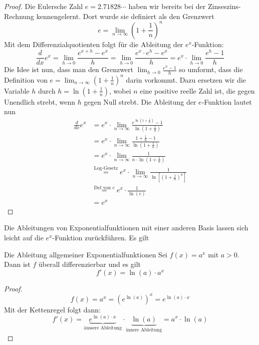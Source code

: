 \begin{proof}
    Die Eulersche Zahl $e=2.71828\cdots$ haben wir bereits bei der Zinseszins-Rechnung kennengelernt. Dort wurde sie definiert als den Grenzwert
    $$
        e= \lim_{n\rightarrow\infty} \left(1+\frac{1}{n}\right)^n
    $$
    Mit dem Differenzialquotienten folgt für die Ableitung der $e^x$-Funktion:
    $$
        \frac{d}{dx} e^x = \lim_{h\rightarrow0} \frac{e^{x+h}-e^x}{h} =  \lim_{h\rightarrow0} \frac{e^{x}\cdot e^h -e^x}{h} = e^x \cdot \lim_{h\rightarrow0} \frac{ e^h - 1}{h}
    $$
    Die Idee ist nun, dass man den Grenzwert $\lim_{h\rightarrow0} \frac{ e^h - 1}{h}$ so umformt, dass die Definition von $e= \lim_{n\rightarrow\infty} \left(1+\frac{1}{n}\right)^n$ darin vorkommt. Dazu ersetzen wir die Variable $h$ durch $h=\ln\left(1+\frac{1}{n}\right) $, wobei $n$ eine positive reelle Zahl ist, die gegen Unendlich strebt, wenn $h$ gegen Null strebt. Die Ableitung der $e$-Funktion lautet nun
    \begin{align*}
        \frac{d}{dx} e^x & =  e^x \cdot \lim_{n\rightarrow\infty} \frac{ e^{\ln\left(1+\frac{1}{n}\right)} - 1}{\ln\left(1+\frac{1}{n}\right)}        \\
                         & = e^x \cdot \lim_{n\rightarrow\infty} \frac{1+\frac{1}{n}-1}{\ln\left(1+\frac{1}{n}\right)}                                \\
                         & = e^x \cdot \lim_{n\rightarrow\infty} \frac{1}{n\cdot \ln\left(1+\frac{1}{n}\right)}                                       \\
                         & \stackrel{\text{Log-Gesetz}}{=} e^x \cdot \lim_{n\rightarrow\infty} \frac{1}{\ln\left[\left(1+\frac{1}{n}\right)^n\right]} \\
                         & \stackrel{\text{Def von }e}{=}  e^x \cdot  \frac{1}{\ln(e)}                                                                \\
                         & = e^x
    \end{align*}
\end{proof}
Die Ableitungen von Exponentialfunktionen mit einer anderen Basis lassen sich leicht auf die $e^x$-Funktion zurückführen. Es gilt
\begin{theo}
    {Die Ableitung allgemeiner Exponentialfunktionen}{}
    Sei $f(x)=a^x$ mit $a>0$. Dann ist $f$ überall differenzierbar und es gilt
    $$
        f'(x)= \ln(a) \cdot a^x
    $$

\end{theo}
\begin{proof}
    $$f(x)=a^x = \left(e^{\ln(a)}\right)^x = e^{\ln(a)\cdot x} $$
    Mit der Kettenregel folgt dann:
    $$f'(x)= \underbrace{e^{\ln(a)\cdot x}}_{\text{äussere Ableitung}} \cdot \underbrace{\ln(a)}_{\text{innere Ableitung}} = a^x \cdot \ln(a)
    $$

\end{proof}


